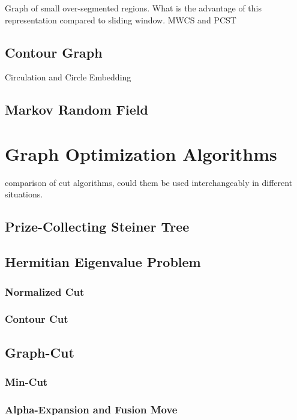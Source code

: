 \documentclass{SMBV12}
\begin{document}
Graph of small over-segmented regions. What is the advantage of this representation compared to sliding window. MWCS and PCST

\subsection{Contour Graph}

Circulation and Circle Embedding

\subsection{Markov Random Field}

\section{Graph Optimization Algorithms}

comparison of cut algorithms, could them be used interchangeably in different situations.

\subsection{Prize-Collecting Steiner Tree}

\subsection{Hermitian Eigenvalue Problem}

\subsubsection{Normalized Cut}

\subsubsection{Contour Cut}

\subsection{Graph-Cut}

\subsubsection{Min-Cut}

\subsubsection{Alpha-Expansion and Fusion Move}
\end{document}
